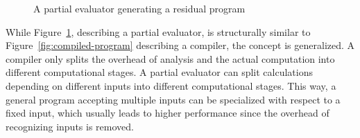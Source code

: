 \begin{figure}[h]
  \centering
  \caption{A partial evaluator generating a residual program}\label{fig:partial-evaluated-program}
\end{figure}

While Figure~\ref{fig:partial-evaluated-program}, describing a partial evaluator, is structurally similar to Figure~\ref{fig:compiled-program} describing a compiler, the concept is generalized.
A compiler only splits the overhead of analysis and the actual computation into different computational stages.
A partial evaluator can split calculations depending on different inputs into different computational stages.
This way, a general program accepting multiple inputs can be specialized with respect to a fixed input, which usually leads to higher performance since the overhead of recognizing inputs is removed.



